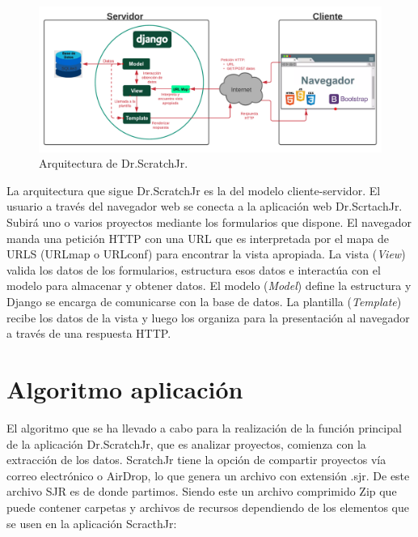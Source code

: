 \documentclass[a4paper, 12pt]{book}
\begin{document}
\begin{figure}[h!]
  \centering
  \includegraphics[width=16cm, keepaspectratio]{img/arquitectura.png}
  \caption{Arquitectura de Dr.ScratchJr.}\label{fig:arquitectura}
\end{figure}

La arquitectura que sigue Dr.ScratchJr es la del modelo cliente-servidor.
El usuario a través del navegador web se conecta a la aplicación web Dr.ScrtachJr.
Subirá uno o varios proyectos mediante los formularios que dispone. 
El navegador manda una petición HTTP con una URL que es interpretada por el mapa de URLS (URLmap o URLconf) para encontrar la vista apropiada.
La vista (\emph{View}) valida los datos de los formularios, estructura esos datos e interactúa con el modelo para almacenar y obtener datos.
El modelo (\emph{Model}) define la estructura y Django se encarga de comunicarse con la base de datos.
La plantilla (\emph{Template}) recibe los datos de la vista y luego los organiza para la presentación al navegador a través de una respuesta HTTP.

\section{Algoritmo aplicación} 
\label{sec:algoritmo}


\vspace{5mm}
El algoritmo que se ha llevado a cabo para la realización de la función principal de la aplicación Dr.ScratchJr, que es analizar proyectos, comienza con la extracción de los datos.
ScratchJr tiene la opción de compartir proyectos vía correo electrónico o AirDrop, lo que genera un archivo con extensión .sjr.
De este archivo SJR es de donde partimos.
Siendo este un archivo comprimido Zip que puede contener carpetas y archivos de recursos dependiendo de los elementos que se usen en la aplicación ScracthJr:
\end{document}
